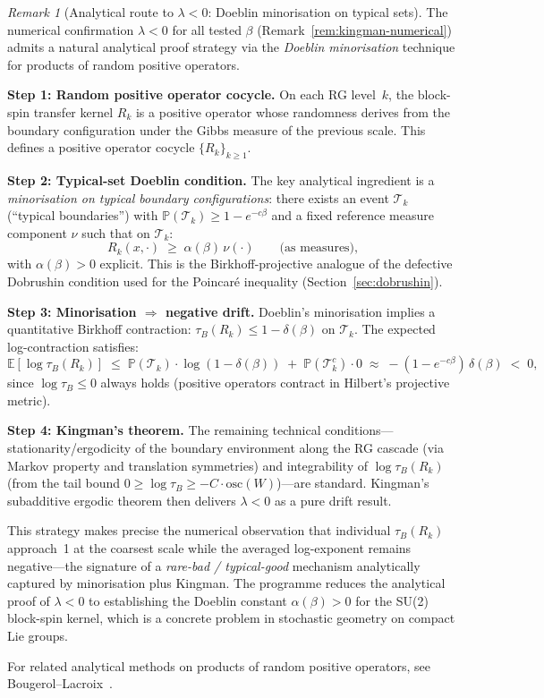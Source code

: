 \documentclass[12pt,a4paper]{article}
\theoremstyle{definition}
\theoremstyle{plain}
\theoremstyle{remark}
\newtheorem{remark}[definition]{Remark}
\begin{document}
\begin{remark}[Analytical route to $\lambda < 0$: Doeblin minorisation on typical sets]
\label{rem:doeblin-analytical}
The numerical confirmation $\lambda < 0$ for all tested $\beta$ (Remark~\ref{rem:kingman-numerical}) admits a natural analytical proof strategy via the \emph{Doeblin minorisation} technique for products of random positive operators.

\textbf{Step 1: Random positive operator cocycle.} On each RG level~$k$, the block-spin transfer kernel $R_k$ is a positive operator whose randomness derives from the boundary configuration under the Gibbs measure of the previous scale. This defines a positive operator cocycle $\{R_k\}_{k \geq 1}$.

\textbf{Step 2: Typical-set Doeblin condition.} The key analytical ingredient is a \emph{minorisation on typical boundary configurations}: there exists an event $\mathcal{T}_k$ (``typical boundaries'') with $\mathbb{P}(\mathcal{T}_k) \geq 1 - e^{-c\beta}$ and a fixed reference measure component $\nu$ such that on $\mathcal{T}_k$:
\[
R_k(x, \cdot) \;\geq\; \alpha(\beta)\, \nu(\cdot) \qquad \text{(as measures),}
\]
with $\alpha(\beta) > 0$ explicit. This is the Birkhoff-projective analogue of the defective Dobrushin condition used for the Poincar\'e inequality (Section~\ref{sec:dobrushin}).

\textbf{Step 3: Minorisation $\Rightarrow$ negative drift.} Doeblin's minorisation implies a quantitative Birkhoff contraction: $\tau_B(R_k) \leq 1 - \delta(\beta)$ on $\mathcal{T}_k$. The expected log-contraction satisfies:
\[
\mathbb{E}[\log \tau_B(R_k)] \;\leq\; \mathbb{P}(\mathcal{T}_k) \cdot \log(1 - \delta(\beta)) \;+\; \mathbb{P}(\mathcal{T}_k^c) \cdot 0 \;\approx\; -(1 - e^{-c\beta})\, \delta(\beta) \;<\; 0,
\]
since $\log \tau_B \leq 0$ always holds (positive operators contract in Hilbert's projective metric).

\textbf{Step 4: Kingman's theorem.} The remaining technical conditions---stationarity/ergodicity of the boundary environment along the RG cascade (via Markov property and translation symmetries) and integrability of $\log \tau_B(R_k)$ (from the tail bound $0 \geq \log \tau_B \geq -C \cdot \mathrm{osc}(W)$)---are standard. Kingman's subadditive ergodic theorem then delivers $\lambda < 0$ as a pure drift result.

This strategy makes precise the numerical observation that individual $\tau_B(R_k)$ approach~1 at the coarsest scale while the averaged log-exponent remains negative---the signature of a \emph{rare-bad / typical-good} mechanism analytically captured by minorisation plus Kingman. The programme reduces the analytical proof of $\lambda < 0$ to establishing the Doeblin constant $\alpha(\beta) > 0$ for the SU(2) block-spin kernel, which is a concrete problem in stochastic geometry on compact Lie groups.

For related analytical methods on products of random positive operators, see Bougerol--Lacroix~\cite{BougerolLacroix1985}.
\end{remark}
\end{document}

